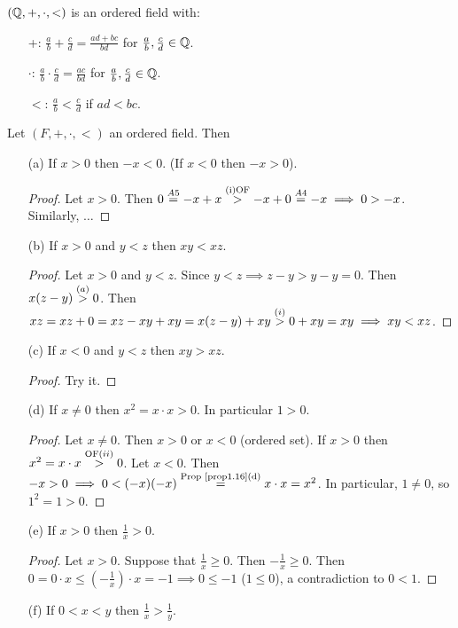 \documentclass[]{article}
\begin{document}
\begin{example}
	$(\mathbb{Q},+,\cdot,<)$ is an ordered field with:
	\begin{enumerate}
		\item[+:] $\frac{a}{b} + \frac{c}{d} = \frac{ad+bc}{bd}$ for $\frac{a}{b},\frac{c}{d}\in\mathbb{Q}$.
		\item[$\cdot$:] $\frac{a}{b}\cdot\frac{c}{d} = \frac{ac}{bd}$ for $\frac{a}{b},\frac{c}{d}\in\mathbb{Q}$.
		\item[$<$:] $\frac{a}{b}<\frac{c}{d}$ if $ad<bc$.
	\end{enumerate}
\end{example}

\begin{proposition}
	Let $(F,+,\cdot,<)$ an ordered field. Then
	\begin{enumerate}
		\item[(a)] If $x>0$ then $-x<0$. (If $x<0$ then $-x>0$).
		\begin{proof}
			Let $x>0$. Then $0 \overset{A5}{=} -x + x \overset{\text{(i)OF}}{>} -x+0 \overset{A4}{=} -x \implies 0>-x$. Similarly, $\dots$
		\end{proof}
		\item[(b)] If $x>0$ and $y<z$ then $xy<xz$.
		\begin{proof}
			Let $x>0$ and $y<z$. Since $y<z\implies z-y >y-y = 0$. Then $x(z-y) \overset{(a)}{>} 0$. Then $xz = xz + 0 = xz - xy + xy = x(z-y) + xy \overset{(i)}{>} 0 + xy = xy \implies xy <xz$.
		\end{proof}
		\item[(c)] If $x<0$ and $y<z$ then $xy>xz$.
		\begin{proof}
			Try it.
		\end{proof}
		\item[(d)] If $x\neq 0$ then $x^2 = x\cdot x >0$. In particular $1>0$.
		\begin{proof}
			Let $x\neq 0$. Then $x>0$ or $x<0$ (ordered set). If $x>0$ then $x^2 = x\cdot x \overset{\text{OF}(ii)}{>}0$. Let $x<0$. Then $-x>0 \implies 0<(-x)(-x) \overset{\text{Prop \ref{prop1.16}(d)}}{=} x\cdot x = x^2$. In particular, $1\neq 0$, so $1^2 = 1 >0$.
		\end{proof}
		\item[(e)] If $x> 0$ then $\frac{1}{x}>0$.
		\begin{proof}
			Let $x>0$. Suppose that $\frac{1}{x}\geq 0$. Then $-\frac{1}{x}\geq 0$. Then $0 = 0\cdot x \leq (-\frac{1}{x})\cdot x = -1 \implies 0\leq -1$ ($1\leq 0$), a contradiction to $0<1$.
		\end{proof}
		\item[(f)] If $0<x<y$ then $\frac{1}{x}>\frac{1}{y}$.
	\end{enumerate}
\end{proposition}
\end{document}
